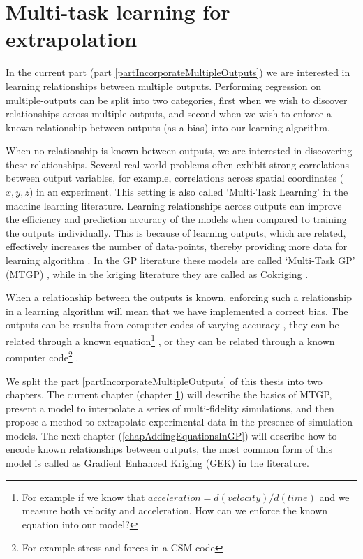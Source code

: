 \chapter{Multi-task learning for extrapolation}
\label{chapMultiTaskExtrapolation}
In the current part (part \ref{partIncorporateMultipleOutputs}) we are interested in learning relationships between multiple outputs. Performing regression on multiple-outputs can be split into two categories, first when we wish to discover relationships across multiple outputs, and second when we wish to enforce a known relationship between outputs (as a bias) into our learning algorithm.

When no relationship is known between outputs, we are interested in discovering these relationships. Several real-world problems often exhibit strong correlations between output variables, for example, correlations across spatial coordinates ($x, y, z$) in an experiment. This setting is also called `Multi-Task Learning' in the machine learning literature. Learning relationships across outputs can improve the efficiency and prediction accuracy of the models when compared to training the outputs individually. This is because of learning outputs, which are related, effectively increases the number of data-points, thereby providing more data for learning algorithm  \cite{caruana1998multitask}. In the GP literature these models are called `Multi-Task GP' (MTGP) \cite{alvarez2011kernels, bonilla_multi-task_2008, Boyle05dependentgaussian}, while in the kriging literature they are called as Cokriging \cite{helterbrand1994universal, chiles1999geostatistics, ver1998constructing}.

\sloppy
When a relationship between the outputs is known, enforcing such a relationship in a learning algorithm will mean that we have implemented a correct bias. The outputs can be results from computer codes of varying accuracy \cite{kennedy2000predicting, forrester2007multi, le2013multi}, they can be related through a known equation\footnote{For example if we know that $acceleration = d(velocity)/d(time)$ and we measure both velocity and acceleration. How can we enforce the known equation into our model?} \cite{ginsbourger2013invariances, sarkka2011linear}, or they can be related through a known computer code\footnote{For example stress and forces in a CSM code} \cite{Constantinescu2013}. 

We split the part \ref{partIncorporateMultipleOutputs} of this thesis into two chapters. The current chapter (chapter \ref{chapMultiTaskExtrapolation}) will describe the basics of MTGP, present a model to interpolate a series of multi-fidelity simulations, and then propose a method to extrapolate experimental data in the presence of simulation models. The next chapter (\ref{chapAddingEquationsInGP}) will describe how to encode known relationships between outputs, the most common form of this model is called as Gradient Enhanced Kriging (GEK) in the literature. 

